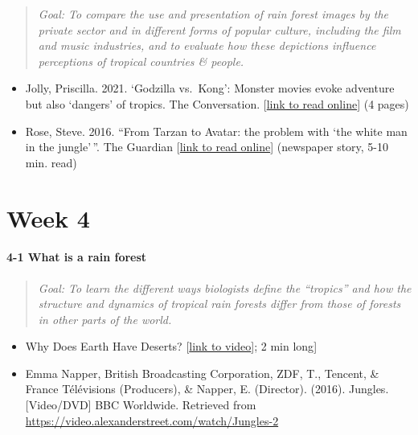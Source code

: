 \documentclass[
  10pt,
  letterpaper,
  oneside,
  open=any]{scrbook}
\let\oldparagraph\paragraph
\renewcommand{\paragraph}[1]{\oldparagraph{#1}\mbox{}}
\begin{document}
\begin{quote}
\emph{Goal: To compare the use and presentation of rain forest images by
the private sector and in different forms of popular culture, including
the film and music industries, and to evaluate how these depictions
influence perceptions of tropical countries \& people.}
\end{quote}

\begin{itemize}
\item
  Jolly, Priscilla. 2021. `Godzilla vs.~Kong': Monster movies evoke
  adventure but also `dangers' of tropics. The Conversation.
  {[}\href{https://theconversation.com/godzilla-vs-kong-monster-movies-evoke-adventure-but-also-dangers-of-tropics-158105}{link
  to read online}{]} (4 pages)
\item
  Rose, Steve. 2016. ``From Tarzan to Avatar: the problem with `the
  white man in the jungle'\,''. The Guardian
  {[}\href{https://www.theguardian.com/film/2016/jul/06/why-the-white-man-in-the-jungle-film-wont-die}{link
  to read online}{]} (newspaper story, 5-10 min. read)
\end{itemize}

\section*{Week 4}\label{week-4}


\paragraph{4-1 What is a rain forest}\label{what-is-a-rain-forest}

\begin{quote}
\emph{Goal: To learn the different ways biologists define the
``tropics'' and how the structure and dynamics of tropical rain forests
differ from those of forests in other parts of the world.}
\end{quote}

\begin{itemize}
\item
  Why Does Earth Have Deserts?
  {[}\href{https://www.youtube.com/watch?v=T6Us1sPXBfA}{link to
  video}{]}; 2 min long{]}
\item
  Emma Napper, British Broadcasting Corporation, ZDF, T., Tencent, \&
  France Télévisions (Producers), \& Napper, E. (Director). (2016).
  Jungles. {[}Video/DVD{]} BBC Worldwide. Retrieved from
  \url{https://video.alexanderstreet.com/watch/Jungles-2}
\end{itemize}
\end{document}
